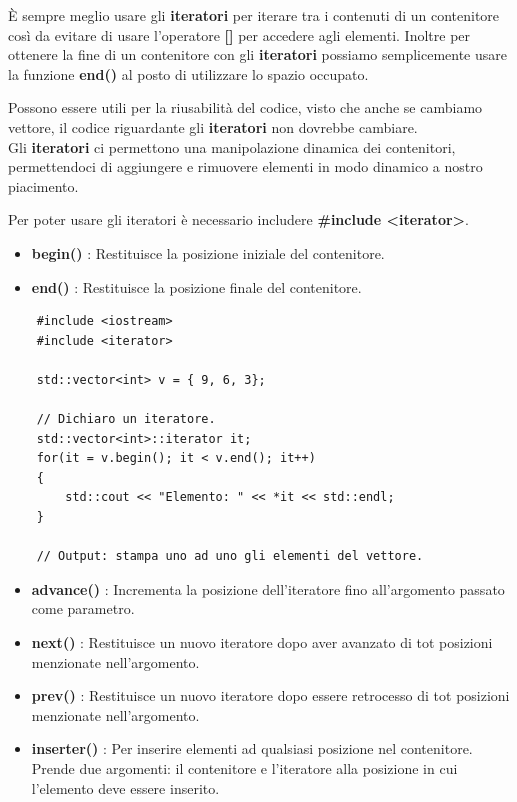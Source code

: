 \vspace{-3.69cm}

\textsf{\small È sempre meglio usare gli \textbf{iteratori} per iterare tra i contenuti di un contenitore così da evitare di usare l'operatore \textbf{[]} per accedere agli elementi. Inoltre per ottenere la fine di un contenitore con gli \textbf{iteratori} possiamo semplicemente usare la funzione \textbf{end()} al posto di utilizzare lo spazio occupato. } \break

\textsf{\small Possono essere utili per la riusabilità del codice, visto che anche se cambiamo vettore, il codice riguardante gli \textbf{iteratori} non dovrebbe cambiare.} \\

\textsf{\small Gli \textbf{iteratori} ci permettono una manipolazione dinamica dei contenitori, permettendoci di aggiungere e rimuovere elementi in modo dinamico a nostro piacimento.} \break

\textsf{\small Per poter usare gli iteratori è necessario includere \textbf{\#include <iterator>}.} \\

\begin{itemize}
	\item \textsf{\small \textbf{begin()} : Restituisce la posizione iniziale del contenitore.}
	\item \textsf{\small \textbf{end()} : Restituisce la posizione finale del contenitore.}
\end{itemize}

\begin{lstlisting}
	#include <iostream>
	#include <iterator>
	
	std::vector<int> v = { 9, 6, 3};
	
	// Dichiaro un iteratore.
	std::vector<int>::iterator it;
	for(it = v.begin(); it < v.end(); it++)
	{
		std::cout << "Elemento: " << *it << std::endl;
	}

	// Output: stampa uno ad uno gli elementi del vettore.
\end{lstlisting}

\begin{itemize}
	\item \textsf{\small \textbf{advance()} : Incrementa la posizione dell'iteratore fino all'argomento passato come parametro.}
	\item \textsf{\small \textbf{next()} : Restituisce un nuovo iteratore dopo aver avanzato di tot posizioni menzionate nell'argomento.}
	\item \textsf{\small \textbf{prev()} : Restituisce un nuovo iteratore dopo essere retrocesso di tot posizioni menzionate nell'argomento.}
	\item \textsf{\small \textbf{inserter()} : Per inserire elementi ad qualsiasi posizione nel contenitore. Prende due argomenti: il contenitore e l'iteratore alla posizione in cui l'elemento deve essere inserito.}
\end{itemize}

